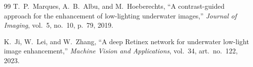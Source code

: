 \documentclass[conference]{IEEEtran}
\begin{document}
\begin{thebibliography}{99}
T.~P.~Marques, A.~B.~Albu, and M.~Hoeberechts, ``A contrast-guided approach for the enhancement of low-lighting underwater images,'' \textit{Journal of Imaging}, vol.~5, no.~10, p.~79, 2019.

K.~Ji, W.~Lei, and W.~Zhang, ``A deep Retinex network for underwater low-light image enhancement,'' \textit{Machine Vision and Applications}, vol.~34, art.\ no.~122, 2023.

\end{thebibliography}
\end{document}
